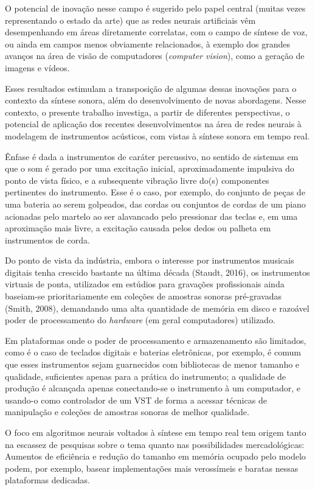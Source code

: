 \documentclass[]{article}
\begin{document}
O potencial de inovação nesse campo é sugerido pelo papel central
(muitas vezes representando o estado da arte) que as redes neurais
artificiais vêm desempenhando em áreas diretamente correlatas, com o
campo de síntese de voz, ou ainda em campos menos obviamente
relacionados, à exemplo dos grandes avanços na área de visão de
computadores (\emph{computer vision}), como a geração de imagens e
vídeos.

Esses resultados estimulam a transposição de algumas dessas inovações
para o contexto da síntese sonora, além do desenvolvimento de novas
abordagens. Nesse contexto, o presente trabalho investiga, a partir de
diferentes perspectivas, o potencial de aplicação dos recentes
desenvolvimentos na área de redes neurais à modelagem de instrumentos
acústicos, com vistas à síntese sonora em tempo real.

Ênfase é dada a instrumentos de caráter percussivo, no sentido de
sistemas em que o som é gerado por uma excitação inicial,
aproximadamente impulsiva do ponto de vista físico, e a subsequente
vibração livre do(s) componentes pertinentes do instrumento. Esse é o
caso, por exemplo, do conjunto de peças de uma bateria ao serem
golpeados, das cordas ou conjuntos de cordas de um piano acionadas pelo
martelo ao ser alavancado pelo pressionar das teclas e, em uma
aproximação mais livre, a excitação causada pelos dedos ou palheta em
instrumentos de corda.

Do ponto de vista da indústria, embora o interesse por instrumentos
musicais digitais tenha crescido bastante na última década (Staudt,
2016), os instrumentos virtuais de ponta, utilizados em estúdios para
gravações profissionais ainda baseiam-se prioritariamente em coleções de
amostras sonoras pré-gravadas (Smith, 2008), demandando uma alta
quantidade de memória em disco e razoável poder de processamento do
\emph{hardware} (em geral computadores) utilizado.

Em plataformas onde o poder de processamento e armazenamento são
limitados, como é o caso de teclados digitais e baterias eletrônicas,
por exemplo, é comum que esses instrumentos sejam guarnecidos com
bibliotecas de menor tamanho e qualidade, suficientes apenas para a
prática do instrumento; a qualidade de produção é alcançada apenas
conectando-se o instrumento à um computador, e usando-o como controlador
de um VST de forma a acessar técnicas de manipulação e coleções de
amostras sonoras de melhor qualidade.

O foco em algoritmos neurais voltados à síntese em tempo real tem origem
tanto na escassez de pesquisas sobre o tema quanto nas possibilidades
mercadológicas: Aumentos de eficiência e redução do tamanho em memória
ocupado pelo modelo podem, por exemplo, basear implementações mais
verossímeis e baratas nessas plataformas dedicadas.
\end{document}
